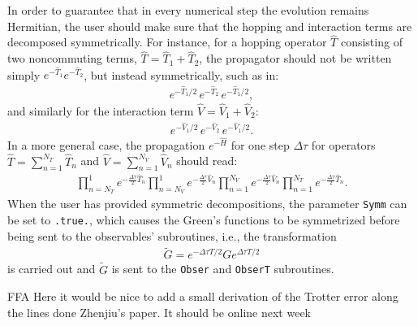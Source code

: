 In order to guarantee that in every numerical step the evolution remains Hermitian, the user should make sure that the hopping and interaction terms are decomposed symmetrically. For instance, for a hopping operator $\hat{T}$ consisting of two noncommuting terms, $\hat{T}=\hat{T}_1+\hat{T}_2$, the propagator should not be written simply $e^{-\hat{T}_1}e^{-\hat{T}_2} $, but instead symmetrically, such as in:
\begin{align}
e^{-\hat{T}_1/2}\, e^{-\hat{T}_2}\, e^{-\hat{T}_1/2},
\end{align}
and similarly for the interaction term $\hat{V}=\hat{V}_1+\hat{V}_2$:
\begin{align}
e^{-\hat{V}_1/2}\, e^{-\hat{V}_2}\, e^{-\hat{V}_1/2}.
\end{align} 
In a more general case, the propagation $e^{-\hat{H}}$ for one step $\Delta \tau$ for operators $\hat{T}= \sum_{n=1}^{N_T} \hat{T}_n$ and $\hat{V}= \sum_{n=1}^{N_V} \hat{V}_n$ should read:
\begin{align}
\prod_{n=N_T}^{1}e^{-\frac{\Delta \tau}{2} \hat{T}_n}
\prod_{n=N_V}^{1}e^{-\frac{\Delta \tau}{2} \hat{V}_n}  \prod_{n=1}^{N_V}e^{-\frac{\Delta \tau}{2} \hat{V}_n}
\prod_{n=1}^{N_T}e^{-\frac{\Delta \tau}{2} \hat{T}_n}.
\end{align}
When the user has provided symmetric decompositions, the parameter \texttt{Symm} can be set to \texttt{.true.}, which causes the Green's functions to be symmetrized before being sent to the observables' subroutines, i.e., the transformation
\begin{align}
\tilde{G} =  e^{-\Delta \tau T /2 } G e^{\Delta \tau T /2 }
\end{align}
is carried out and $ \tilde{G} $  is sent to the \texttt{Obser} and \texttt{ObserT} subroutines.

\noindent
{\color{red}  FFA    Here it would be nice to add a small  derivation of the Trotter error  along the lines  done  Zhenjiu's paper.  It should be online next week} 

